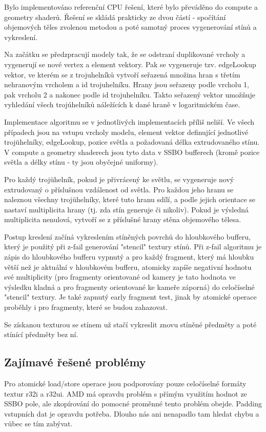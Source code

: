 \documentclass[a4paper, 12pt]{article}
\begin{document}
Bylo implementováno referenční CPU řešení, které bylo převáděno do compute a geometry shaderů.
Řešení se skládá prakticky ze dvou částí - spočítání objemových těles zvolenou metodou a poté
samotný proces vygenerování stínů a vykreslení.

Na začátku se předzpracují modely tak, že se odstraní duplikované vrcholy a vygenerují se nové
vertex a element vektory. Pak se vygeneruje tzv. edgeLookup vektor, ve kterém se z trojuhelníků 
vytvoří seřazená množina hran s třetím nehranovým vrcholem a id trojuhelníku. Hrany jsou seřazeny
 podle vrcholu 1, pak vrcholu 2 a nakonec podle id trojuhelníku. Takto seřazený vektor umožňuje vyhledání všech trojúhelníků náležících k dané hraně v logaritmickém čase.

Implementace algoritmu se v jednotlivých implementacích příliš neliší. Ve všech případech jsou na
vstupu vrcholy modelu, element vektor definující jednotlivé trojühelníky, edgeLookup, pozice světla a 
požadovaná délka extrudovaného stínu. V compute a geometry shaderech jsou tyto data v SSBO bufferech
(kromě pozice světla a délky stínu - ty jsou obyčejné uniformy).
 
Pro každý trojühelník, pokud je přivrácený ke světlu, se vygeneruje nový extrudovaný o příslušnou vzdálenost
od světla. Pro každou jeho hranu se naleznou všechny trojühelníky, které tuto hranu sdílí, a podle jejich orientace se nastaví multiplicita hrany (tj. zda stín generuje či nikoliv).
Pokud je výsledná multiplicita nenulová, vytvoří se z příslušné hrany stěna objemového tělesa.



Postup kreslení začíná vykreslením stíněných povrchů do hloubkového bufferu, který je použitý při 
z-fail generování "stencil" textury stínů. Při z-fail algoritmu je zápis do hloubkového bufferu vypnutý
a pro každý fragment, který má hloubku větší než je aktuální v hloubkovém bufferu, atomicky zapíše negativní
hodnotu své multiplicity (pro fragmenty orientované od kamery je tato hodnota ve výsledku kladná a pro
fragmenty orientované ke kameře záporná) do celočíselné "stencil" textury. Je také zapnutý early fragment test,
jinak by atomické operace proběhly i pro fragmenty, které se budou zahazovat.

Se získanou texturou se stínem už stačí vykreslit znovu stíněné předměty a poté stínící předměty bez ní.

\subsection{Zajímavé řešené problémy}
Pro atomické load/store operace jsou podporovány pouze celočíselné formáty textur r32i a r32ui.
AMD má opravdu problém s přímým využitím hodnot ze SSBO pole, ale zkopírování do pomocné proměnné tento problém obejde.
Padding vstupních dat je opravdu potřeba. Dlouho nás ani nenapadlo tam hledat chybu a vůbec se tím zabývat. 
\end{document}
